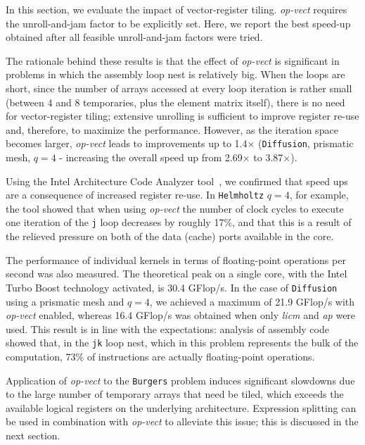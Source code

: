 In this section, we evaluate the impact of vector-register tiling. \emph{op-vect} requires the unroll-and-jam factor to be explicitly set. Here, we report the best speed-up obtained after all feasible unroll-and-jam factors were tried. 

The rationale behind these results is that the effect of \emph{op-vect} is significant in problems in which the assembly loop nest is relatively big. When the loops are short, since the number of arrays accessed at every loop iteration is rather small (between 4 and 8 temporaries, plus the element matrix itself), there is no need for
vector-register tiling; extensive unrolling is sufficient to improve register re-use and, therefore, to maximize the performance. However, as the iteration space becomes larger, \emph{op-vect} leads to improvements up to 1.4$\times$ ({\tt Diffusion}, prismatic mesh, $q=4$ - increasing the overall speed up from 2.69$\times$ to 3.87$\times$).

Using the Intel Architecture Code Analyzer tool~\citep{IACA}, we confirmed that speed ups are a consequence of increased register re-use. In {\tt Helmholtz} $q=4$, for example, the tool showed that when using \emph{op-vect} the number of clock cycles to execute one iteration of the \texttt{j} loop decreases by roughly 17$\%$, and that this is a result of the relieved pressure on both of the data (cache) ports available in the core.

The performance of individual kernels in terms of floating-point operations per second was also measured. The theoretical peak on a single core, with the Intel Turbo Boost technology activated, is 30.4 GFlop/s. In the case of {\tt Diffusion} using a prismatic mesh and $q=4$, we achieved a maximum of 21.9 GFlop/s with \emph{op-vect} enabled, whereas 16.4 GFlop/s was obtained when only \emph{licm} and \emph{ap} were used. This result is in line with the expectations: analysis of assembly code showed that, in the \texttt{jk} loop nest, which in this problem represents the bulk of the computation, 73$\%$ of instructions are actually floating-point operations.

Application of \emph{op-vect} to the {\tt Burgers} problem induces significant slowdowns due to the large number of temporary arrays that need be tiled, which exceeds the available logical registers on the underlying architecture. Expression splitting can be used in combination with \emph{op-vect} to alleviate this issue; this is discussed in the next section.


